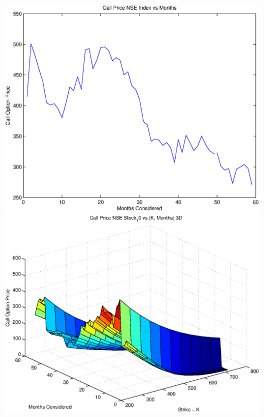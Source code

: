 \documentclass{article}
\begin{document}
\includegraphics[width=\textwidth]{Call_Price_NSE_Index_vs_Months} \\

\includegraphics[width=\textwidth]{Call_Price_NSE_Stock_10_vs_(K,_Months)_3D} \\
\end{document}
